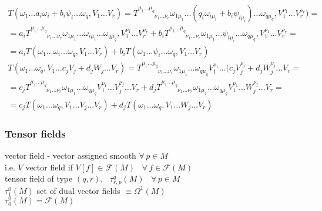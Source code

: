 \documentclass[twoside]{amsart}
\begin{document}
\[
\begin{gathered}
  T(\omega_1 \dots a_i \omega_i + b_i \psi_i \dots \omega_q, V_1 \dots V_r) = T^{\mu_1 \dots \mu_q}_{\phantom{\mu_1 \dots \mu_q} \nu_1 \dots \nu_r } \omega_{1 \mu_1} \dots (q_i \omega_{i \mu_i} + b_i \psi_{i \mu_i} ) \dots \omega_{q \mu_q} , V_1^{\nu_1} \dots V_r^{\nu_r} ) =  \\
  = a_i T^{\mu_1 \dots \mu_q}_{\phantom{\mu_1 \dots \mu_q} \nu_1 \dots \nu_r } \omega_{1 \mu_1} \dots \omega_{i \mu_i} \dots \omega_{q \mu_q} , V_1^{\nu_1} \dots V_r^{\nu_r} + b_i T^{\mu_1 \dots \mu_q}_{\phantom{\mu_1 \dots \mu_q} \nu_1 \dots \nu_r } \omega_{1 \mu_1} \dots \psi_{i \mu_i} \dots \omega_{q \mu_q} , V_1^{\nu_1} \dots V_r^{\nu_r} = \\
  = a_i T(\omega_1 \dots \omega_i \dots \omega_q, V_1 \dots V_r) + b_i T(\omega_1 \dots \psi_i \dots \omega_q, V_1 \dots V_r)
\end{gathered}
\]
\[
\begin{gathered}
  T(\omega_1 \dots \omega_q, V_1 \dots c_j V_j + d_j W_j \dots V_r) = T^{ \mu_1 \dots \mu_q}_{\phantom{\mu_1 \dots \mu_q} \nu_1 \dots \nu_r} \omega_{1\mu_1} \dots \omega_{q \mu_q} V_1^{\nu_1} \dots (c_j V_j^{\nu_j} + d_j W_j^{\nu_j} \dots V_r = \\
  = c_j T^{\mu_1 \dots \mu_q}_{\phantom{\mu_1 \dots \mu_q} \nu_1 \dots \nu_r } \omega_{1 \mu_1} \dots \omega_{q \mu_q}  V_1^{\nu_1} \dots V_j^{\nu_j} \dots V_r + d_j T^{\mu_1 \dots \mu_q}_{\phantom{\mu_1 \dots \mu_q} \nu_1 \dots \nu_r } \omega_{1 \mu_1} \dots \omega_{q \mu_q}  V_1^{\nu_1} \dots W_j^{\nu_j} \dots V_r = \\
      = c_j T(\omega_1 \dots \omega_q, V_1 \dots V_j \dots V_r) + d_j T(\omega_1 \dots \omega_q, V_1 \dots W_j \dots V_r)
\end{gathered}
\]

\subsubsection{Tensor fields}

vector field - vector assigned smooth $\forall \, p \in M$ \\
\quad i.e. $V$ vector field if $V[f] \in \mathcal{F}(M)$ \quad \, $\forall \, f \in \mathcal{F}(M)$ \\

tensor field of type $(q,r)$, \, $\tau^q_{r,p}(M)$ \, $\forall \, p \in M$ \\
$\tau_1^0(M)$ set of dual vector fields $\equiv \Omega^1(M)$ \\
$\tau_0^0(M) = \mathcal{F}(M)$
\end{document}
